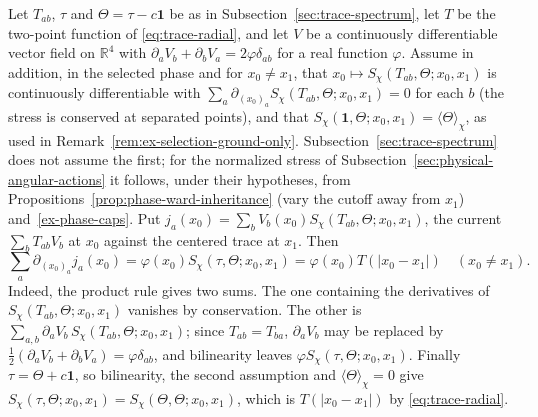 \begin{remark}
\label{rem:trace-dilation-current}
Let $T_{ab}$, $\tau$ and $\Theta=\tau-c\mathbf1$ be as in
Subsection~\ref{sec:trace-spectrum}, let $T$ be the two-point function of
\eqref{eq:trace-radial}, and let $V$ be a continuously
differentiable vector field on $\mathbb R^4$ with
$\partial_aV_b+\partial_bV_a=2\varphi\delta_{ab}$ for a real function
$\varphi$. Assume in addition, in the selected phase and for
$x_0\neq x_1$, that $x_0\mapsto S_\chi(T_{ab},\Theta;x_0,x_1)$ is
continuously differentiable with
$\sum_a\partial_{(x_0)_a}S_\chi(T_{ab},\Theta;x_0,x_1)=0$ for each $b$
(the stress is conserved at separated points), and that
$S_\chi(\mathbf1,\Theta;x_0,x_1)=\langle\Theta\rangle_\chi$, as used in
Remark~\ref{rem:ex-selection-ground-only}. Subsection~\ref{sec:trace-spectrum}
does not assume the first; for the normalized stress of
Subsection~\ref{sec:physical-angular-actions} it follows, under their
hypotheses, from Propositions~\ref{prop:phase-ward-inheritance} (vary the
cutoff away from $x_1$) and~\ref{ex-phase-caps}. Put
$j_a(x_0)=\sum_bV_b(x_0)S_\chi(T_{ab},\Theta;x_0,x_1)$, the current
$\sum_bT_{ab}V_b$ at $x_0$ against the centered trace at $x_1$. Then
\[
 \sum_a\partial_{(x_0)_a}j_a(x_0)=\varphi(x_0)S_\chi(\tau,\Theta;x_0,x_1)
       =\varphi(x_0)T(|x_0-x_1|)\quad(x_0\neq x_1).
\]
Indeed, the product rule gives two sums. The one containing the
derivatives of $S_\chi(T_{ab},\Theta;x_0,x_1)$ vanishes by
conservation. The other is
$\sum_{a,b}\partial_aV_b\,S_\chi(T_{ab},\Theta;x_0,x_1)$; since
$T_{ab}=T_{ba}$, $\partial_aV_b$ may be replaced by
$\frac12(\partial_aV_b+\partial_bV_a)=\varphi\delta_{ab}$, and
bilinearity leaves $\varphi S_\chi(\tau,\Theta;x_0,x_1)$. Finally
$\tau=\Theta+c\mathbf1$, so bilinearity, the second assumption and
$\langle\Theta\rangle_\chi=0$ give
$S_\chi(\tau,\Theta;x_0,x_1)=S_\chi(\Theta,\Theta;x_0,x_1)$, which is
$T(|x_0-x_1|)$ by \eqref{eq:trace-radial}.


\end{remark}

